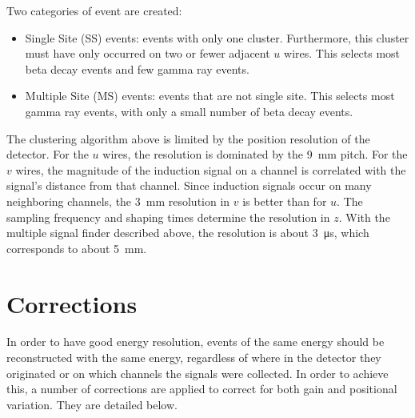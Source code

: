 \documentclass[herrin-thesis.tex]{subfiles}
\begin{document}
Two categories of event are created:
\begin{itemize}
\item Single Site (SS) events: events with only one cluster. Furthermore, this cluster must have only occurred on two or fewer adjacent \(u\) wires. This selects most beta decay events and few gamma ray events.
\item Multiple Site (MS) events: events that are not single site. This selects most gamma ray events, with only a small number of beta decay events.
\end{itemize}

The clustering algorithm above is limited by the position resolution of the detector. For the \(u\) wires, the resolution is dominated by the \SI{9}{\mm} pitch. For the \(v\) wires, the magnitude of the induction signal on a channel is correlated with the signal's distance from that channel. Since induction signals occur on many neighboring channels, the \SI{3}{\mm} resolution in \(v\) is better than for \(u\). The sampling frequency and shaping times determine the resolution in \(z\). With the multiple signal finder described above, the resolution is about \SI{3}{\micro\s}, which corresponds to about \SI{5}{\mm}.

\section{Corrections}
\label{sec:data_corrections}
In order to have good energy resolution, events of the same energy should be reconstructed with the same energy, regardless of where in the detector they originated or on which channels the signals were collected. In order to achieve this, a number of corrections are applied to correct for both gain and positional variation. They are detailed below.
\end{document}
